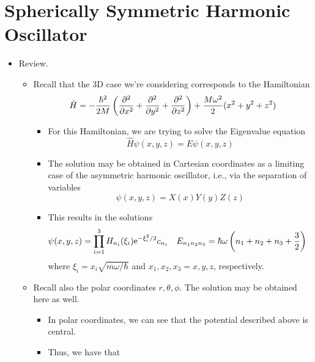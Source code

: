 \documentclass[../notes.tex]{subfiles}
\begin{document}
\section{Spherically Symmetric Harmonic Oscillator}
\begin{itemize}
    \item {}Review.
    \begin{itemize}
        \item Recall that the 3D case we're considering corresponds to the Hamiltonian
        \begin{equation*}
            \hat{H} = -\frac{\hbar^2}{2M}\left( \pdv[2]{x}+\pdv[2]{y}+\pdv[2]{z} \right)+\frac{M\omega^2}{2}(x^2+y^2+z^2)
        \end{equation*}
        \begin{itemize}
            \item For this Hamiltonian, we are trying to solve the Eigenvalue equation
            \begin{equation*}
                \hat{H}\psi(x,y,z) = E\psi(x,y,z)
            \end{equation*}
            \item The solution may be obtained in Cartesian coordinates as a limiting case of the asymmetric harmonic oscillator, i.e., via the separation of variables
            \begin{equation*}
                \psi(x,y,z) = X(x)Y(y)Z(z)
            \end{equation*}
            \item This results in the solutions
            \begin{align*}
                \psi(x,y,z) &= \prod_{i=1}^3H_{n_i}(\xi_i)\e[-\xi_i^2/2]c_{n_i}&
                E_{n_1n_2n_3} &= \hbar\omega\left( n_1+n_2+n_3+\frac{3}{2} \right)
            \end{align*}
            where $\xi_i=x_i\sqrt{m\omega/\hbar}$ and $x_1,x_2,x_3=x,y,z$, respectively.
        \end{itemize}
        \item Recall also the polar coordinates $r,\theta,\phi$. The solution may be obtained here as well.
        \begin{itemize}
            \item In polar coordinates, we can see that the potential described above is central.
            \item Thus, we have that
            \begin{equation*}

\end{equation*}
\end{itemize}
\end{itemize}
\end{itemize}
\end{document}
